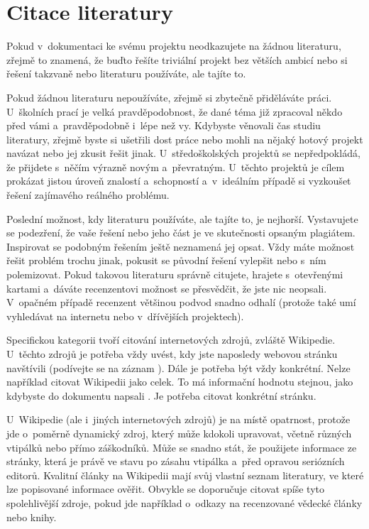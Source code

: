 \section{Citace literatury}
Pokud v~dokumentaci ke svému projektu neodkazujete na žádnou literaturu, zřejmě to znamená, že buďto řešíte triviální projekt bez větších ambicí nebo si řešení takzvaně  nebo literaturu používáte, ale tajíte to.

Pokud žádnou literaturu nepoužíváte, zřejmě si zbytečně přiděláváte práci. U~školních prací je velká pravděpodobnost, že dané téma již zpracoval někdo před vámi a~pravděpodobně i~lépe než vy. Kdybyste věnovali čas studiu literatury, zřejmě byste si ušetřili dost práce nebo mohli na nějaký hotový projekt navázat nebo jej zkusit řešit jinak. U~středoškolských projektů se nepředpokládá, že přijdete s~něčím výrazně novým a~převratným. U~těchto projektů je cílem prokázat jistou úroveň znalostí a~schopností a~v~ideálním případě si vyzkoušet řešení zajímavého reálného problému.

Poslední možnost, kdy literaturu používáte, ale tajíte to, je nejhorší. Vystavujete se podezření, že vaše řešení nebo jeho část je ve skutečnosti opsaným plagiátem. Inspirovat se podobným řešením ještě neznamená jej opsat. Vždy máte možnost řešit problém trochu jinak, pokusit se původní řešení vylepšit nebo s~ním polemizovat. Pokud takovou literaturu správně citujete, hrajete s~otevřenými kartami a~dáváte recenzentovi možnost se přesvědčit, že jste nic neopsali. V~opačném případě recenzent většinou podvod snadno odhalí (protože také umí vyhledávat na internetu nebo v~dřívějších projektech).

Specifickou kategorii tvoří citování internetových zdrojů, zvláště Wikipedie. U~těchto zdrojů je potřeba vždy uvést, kdy jste naposledy webovou stránku navštívili (podívejte se na záznam \parencite{Citace15}). Dále je potřeba být vždy konkrétní. Nelze například citovat Wikipedii jako celek. To má informační hodnotu stejnou, jako kdybyste do dokumentu napsali . Je potřeba citovat konkrétní stránku.

U~Wikipedie (ale i~jiných internetových zdrojů) je na místě opatrnost, protože jde o~poměrně dynamický zdroj, který může kdokoli upravovat, včetně různých vtipálků nebo přímo záškodníků. Může se snadno stát, že použijete informace ze stránky, která je právě ve stavu po zásahu vtipálka a~před opravou seriózních editorů. Kvalitní články na Wikipedii mají svůj vlastní seznam literatury, ve které lze popisované informace ověřit. Obvykle se doporučuje citovat spíše tyto spolehlivější zdroje, pokud jde například o~odkazy na recenzované vědecké články nebo knihy.









